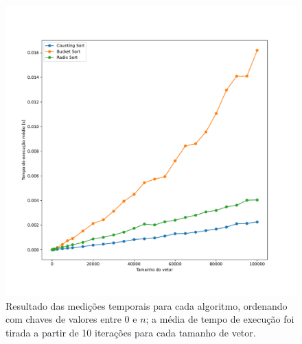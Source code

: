 \documentclass[fontsize=10pt]{article}
\begin{document}
\begin{figure}[]
\begin{center}
    \includegraphics[scale=0.4]{imagens/0302.pdf}
    \caption{Resultado das medições temporais para cada algoritmo, ordenando com chaves de valores entre 0 e $n$; a média de tempo de execução foi tirada a partir de 10 iterações para cada tamanho de vetor.}
    \label{Figura 1}
\end{center}
\end{figure}
\end{document}
